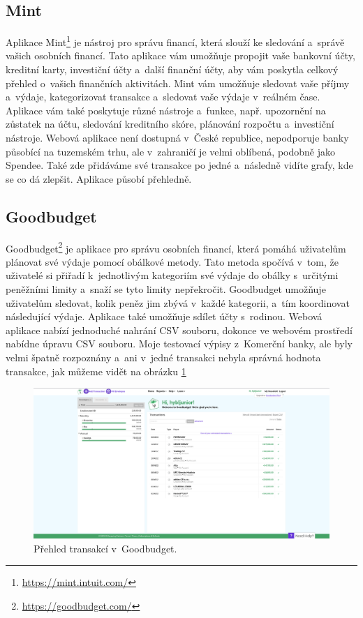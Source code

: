 \subsection{Mint}
Aplikace Mint\footnote{\url{https://mint.intuit.com/}} je nástroj pro správu financí, která slouží ke sledování a~správě vašich osobních financí. Tato aplikace vám umožňuje propojit vaše bankovní účty, kreditní karty, investiční účty a~další finanční účty, aby vám poskytla celkový přehled o~vašich finančních aktivitách. Mint vám umožňuje sledovat vaše příjmy a~výdaje, kategorizovat transakce a~sledovat vaše výdaje v~reálném čase. Aplikace vám také poskytuje různé nástroje a~funkce, např. upozornění na zůstatek na účtu, sledování kreditního skóre, plánování rozpočtu a~investiční nástroje. Webová aplikace není dostupná v~České republice, nepodporuje banky působící na tuzemském trhu, ale v~zahraničí je velmi oblíbená, podobně jako Spendee. Také zde přidáváme své transakce po jedné a~následně vidíte grafy, kde se co dá zlepšit. Aplikace působí přehledně.

\subsection{Goodbudget}
Goodbudget\footnote{\url{https://goodbudget.com/}} je aplikace pro správu osobních financí, která pomáhá uživatelům plánovat své výdaje pomocí obálkové metody. Tato metoda spočívá v~tom, že uživatelé si přiřadí k~jednotlivým kategoriím své výdaje do obálky s~určitými peněžními limity a~snaží se tyto limity nepřekročit. Goodbudget umožňuje uživatelům sledovat, kolik peněz jim zbývá v~každé kategorii, a~tím koordinovat následující výdaje. Aplikace také umožňuje sdílet účty s~rodinou.
Webová aplikace nabízí jednoduché nahrání CSV souboru, dokonce ve webovém prostředí nabídne úpravu CSV souboru. Moje testovací výpisy z~Komerční banky, ale byly velmi špatně rozpoznány a~ani v~jedné transakci nebyla správná hodnota transakce, jak můžeme vidět na obrázku \ref{fig:goodbudget}
\begin{figure}[ht]
    \centering
    \includegraphics[width=\textwidth]{obrazky-figures/goodbudget.png}
    \caption{Přehled transakcí v~Goodbudget.}
    \label{fig:goodbudget}
\end{figure}

